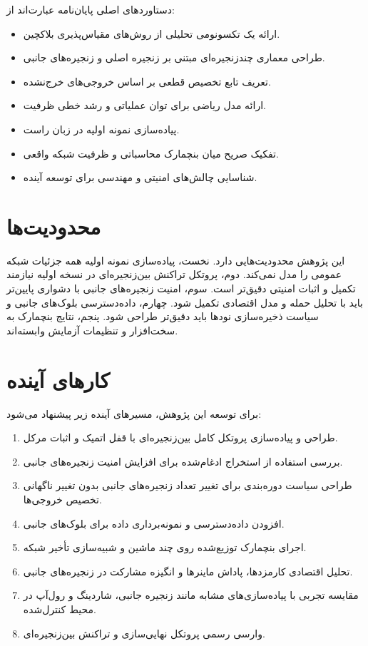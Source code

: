 دستاوردهای اصلی پایان‌نامه عبارت‌اند از:

\begin{itemize}
\item ارائه یک تکسونومی تحلیلی از روش‌های مقیاس‌پذیری بلاکچین.
\item طراحی معماری چندزنجیره‌ای مبتنی بر زنجیره اصلی و زنجیره‌های جانبی.
\item تعریف تابع تخصیص قطعی بر اساس خروجی‌های خرج‌نشده.
\item ارائه مدل ریاضی برای توان عملیاتی و رشد خطی ظرفیت.
\item پیاده‌سازی نمونه اولیه در زبان راست.
\item تفکیک صریح میان بنچمارک محاسباتی و ظرفیت شبکه واقعی.
\item شناسایی چالش‌های امنیتی و مهندسی برای توسعه آینده.
\end{itemize}

\section{محدودیت‌ها}

این پژوهش محدودیت‌هایی دارد. نخست، پیاده‌سازی نمونه اولیه همه جزئیات شبکه عمومی را مدل نمی‌کند. دوم، پروتکل تراکنش بین‌زنجیره‌ای در نسخه اولیه نیازمند تکمیل و اثبات امنیتی دقیق‌تر است. سوم، امنیت زنجیره‌های جانبی با دشواری پایین‌تر باید با تحلیل حمله و مدل اقتصادی تکمیل شود. چهارم، داده‌دسترسی بلوک‌های جانبی و سیاست ذخیره‌سازی نودها باید دقیق‌تر طراحی شود. پنجم، نتایج بنچمارک به سخت‌افزار و تنظیمات آزمایش وابسته‌اند.

\section{کارهای آینده}

برای توسعه این پژوهش، مسیرهای آینده زیر پیشنهاد می‌شود:

\begin{enumerate}
\item طراحی و پیاده‌سازی پروتکل کامل بین‌زنجیره‌ای با قفل اتمیک و اثبات مرکل.
\item بررسی استفاده از استخراج ادغام‌شده برای افزایش امنیت زنجیره‌های جانبی.
\item طراحی سیاست دوره‌بندی برای تغییر تعداد زنجیره‌های جانبی بدون تغییر ناگهانی تخصیص خروجی‌ها.
\item افزودن داده‌دسترسی و نمونه‌برداری داده برای بلوک‌های جانبی.
\item اجرای بنچمارک توزیع‌شده روی چند ماشین و شبیه‌سازی تأخیر شبکه.
\item تحلیل اقتصادی کارمزدها، پاداش ماینرها و انگیزه مشارکت در زنجیره‌های جانبی.
\item مقایسه تجربی با پیاده‌سازی‌های مشابه مانند زنجیره جانبی، شاردینگ و رول‌آپ در محیط کنترل‌شده.
\item وارسی رسمی پروتکل نهایی‌سازی و تراکنش بین‌زنجیره‌ای.
\end{enumerate}

